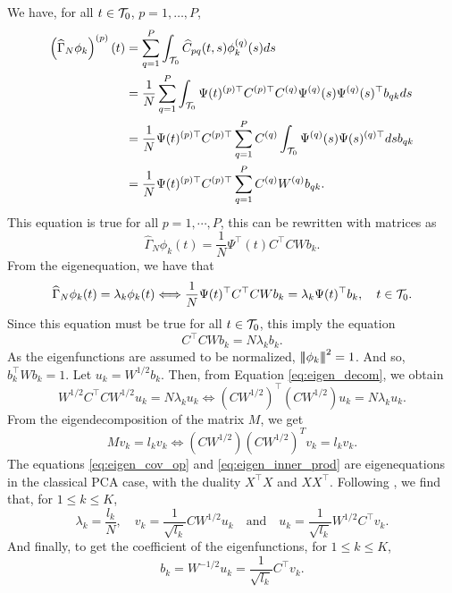 We have, for all $t \in \mathcal{T}_{0}$, $p = 1, \dots, P$,
\begin{align*}
    \left(\widehat{\Gamma}_N \phi_k\right)^{(p)}(t) &= \sum_{q = 1}^P \int_{\mathcal{T}_{0}} \widehat{C}_{p q}(t, s)\phi_k^{(q)}(s)ds \\
    &= \frac{1}{N}\sum_{q = 1}^P \int_{\mathcal{T}_{0}} \Psi(t)^{(p) \top} C^{(p) \top} C^{(q)} \Psi^{(q)}(s) \Psi^{(q)}(s)^\top b_{q k} ds \\
    &= \frac{1}{N} \Psi(t)^{(p) \top} C^{(p) \top} \sum_{q = 1}^P C^{(q)} \int_{\mathcal{T}_{0}} \Psi^{(q)}(s) \Psi(s)^{(q) \top} ds b_{q k} \\
    &= \frac{1}{N} \Psi(t)^{(p) \top} C^{(p) \top} \sum_{q = 1}^P C^{(q)} W^{(q)} b_{q k}. \\
\end{align*}
This equation is true for all $p = 1, \cdots, P$, this can be rewritten with matrices as
\begin{equation}
    \widehat{\Gamma}_N \phi_k(t) = \frac{1}{N}\Psi^\top(t) C^\top C W b_k.
\end{equation}
From the eigenequation, we have that
\begin{equation}
    \widehat{\Gamma}_N \phi_k(t) = \lambda_k \phi_k(t) \Longleftrightarrow \frac{1}{N} \Psi(t)^\top C^\top C W b_k = \lambda_k \Psi(t)^\top b_k, \quad t \in \mathcal{T}_{0}.
\end{equation}
Since this equation must be true for all $t \in \mathcal{T}_{0}$, this imply the equation
\begin{equation}\label{eq:eigen_decom}
    C^\top C W b_k = N\lambda_k b_k.
\end{equation}
As the eigenfunctions are assumed to be normalized, $\left|\!\left|\!\left|\phi_k\right|\!\right|\!\right|^2 = 1$. And so, $b_k^\top W b_k = 1$. Let $u_k = W^{1/2}b_k$. Then, from Equation \eqref{eq:eigen_decom}, we obtain
\begin{equation}\label{eq:eigen_cov_op}
    W^{1/2} C^\top C W^{1/2} u_k = N\lambda_k u_k \Longleftrightarrow \left(C W^{1/2}\right)^\top \left(C W^{1/2}\right) u_k = N\lambda_k u_k.
\end{equation}
From the eigendecomposition of the matrix $M$, we get
\begin{equation}\label{eq:eigen_inner_prod}
    Mv_k = l_k v_k \Longleftrightarrow \left(C W^{1/2}\right)\left(C W^{1/2}\right)^T v_k = l_k v_k.
\end{equation}
The equations \eqref{eq:eigen_cov_op} and \eqref{eq:eigen_inner_prod} are eigenequations in the classical PCA case, with the duality $X^\top X$ and $XX^\top$. Following \cite{pagesMultipleFactorAnalysis2014}, we find that, for $1 \leq k \leq K$,
\begin{equation}
    \lambda_k = \frac{l_k}{N}, \quad v_k = \frac{1}{\sqrt{l_k}}C W^{1/2} u_k \quad\text{and}\quad u_k = \frac{1}{\sqrt{l_k}} W^{1/2} C^\top v_k.
\end{equation}
And finally, to get the coefficient of the eigenfunctions, for $1 \leq k \leq K$,
\begin{equation}
    b_k = W^{-1/2}u_k = \frac{1}{\sqrt{l_k}} C^\top v_k.
\end{equation}

